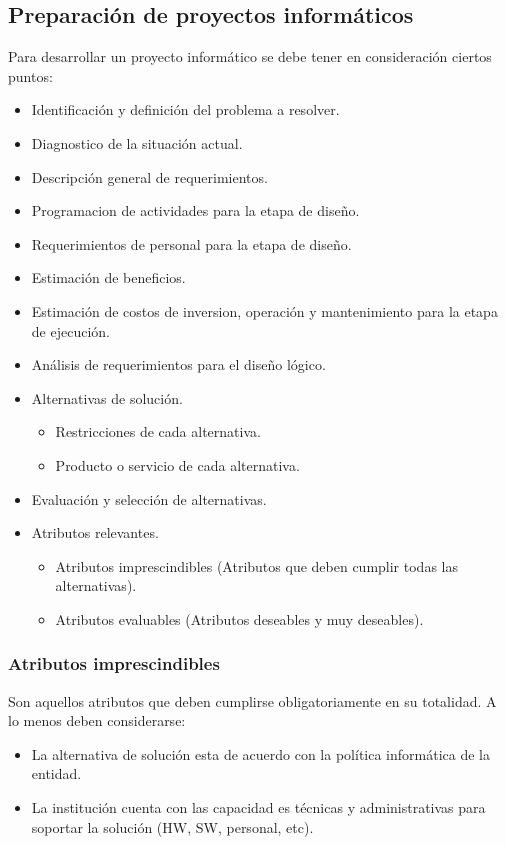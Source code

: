 \documentclass{templateNote}
\begin{document}
\subsection{Preparación de proyectos informáticos}
Para desarrollar un proyecto informático se debe tener en consideración ciertos puntos:

\begin{itemize}
    \item Identificación y definición del problema a resolver.
    \item Diagnostico de la situación actual.
    \item Descripción general de requerimientos.
    \item Programacion de actividades para la etapa de diseño.
    \item Requerimientos de personal para la etapa de diseño.
    \item Estimación de beneficios.
    \item Estimación de costos de inversion, operación y mantenimiento para la etapa de ejecución.
    \item Análisis de requerimientos para el diseño lógico.
    \item Alternativas de solución.
    \begin{itemize}
        \item Restricciones de cada alternativa.
        \item Producto o servicio de cada alternativa.
    \end{itemize}
    \item Evaluación y selección de alternativas.
    \item Atributos relevantes.
    \begin{itemize}
        \item Atributos imprescindibles (Atributos que deben cumplir todas las alternativas).
        \item Atributos evaluables (Atributos deseables y muy deseables).
    \end{itemize}
\end{itemize}

\subsubsection{Atributos imprescindibles}
Son aquellos atributos que deben cumplirse obligatoriamente en su totalidad. A lo menos deben considerarse:
\begin{itemize}
    \item La alternativa de solución esta de acuerdo con la política informática de la entidad.
    \item La institución cuenta con las capacidad es técnicas y administrativas para soportar la solución (HW, SW, personal, etc).
\end{itemize}
\end{document}
